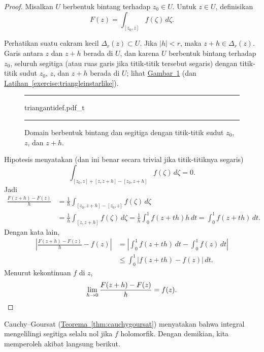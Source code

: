 \documentclass[12pt,openany]{book}
\newcommand{\sabs}[1]{\lvert {#1} \rvert}
\newcommand{\abs}[1]{\left\lvert {#1} \right\rvert}
\theoremstyle{plain}
\theoremstyle{remark}
\theoremstyle{definition}
\newenvironment{myfig}{%
\begin{figure}[h!t]
\noindent\rule{\textwidth}{0.5pt}\vspace{12pt}\par\centering}%
{\par\noindent\rule{\textwidth}{0.5pt}
\end{figure}}
\theoremstyle{exercise}
\theoremstyle{example}
\newcommand{\figureref}[1]{\hyperref[#1]{Gambar~\ref*{#1}}}
\newcommand{\exerciseref}[1]{\hyperref[#1]{Latihan~\ref*{#1}}}
\newcommand{\thmref}[1]{\hyperref[#1]{Teorema~\ref*{#1}}}
\begin{document}
\begin{proof}
Misalkan $U$ berbentuk bintang terhadap $z_0 \in U$.
Untuk $z \in U$, definisikan
\begin{equation*}
F(z) = \int_{[z_0,z]} f(\zeta) \, d\zeta .
\end{equation*}

Perhatikan suatu cakram kecil $\Delta_r(z) \subset U$.
Jika $\sabs{h} < r$, maka
$z+h \in \Delta_r(z)$.
Garis antara $z$ dan $z+h$ berada di $U$, dan
karena $U$ berbentuk bintang terhadap $z_0$, 
seluruh segitiga (atau ruas garis jika titik-titik tersebut segaris)
dengan titik-titik sudut $z_0$, $z$, dan $z+h$
berada di $U$; lihat \figureref{fig:triangantidef}
(dan \exerciseref{exercise:triangleinstarlike}).
\begin{myfig}
{triangantidef.pdf_t}
\caption{Domain berbentuk bintang dan segitiga dengan titik-titik sudut
$z_0$, $z$, dan $z+h$.\label{fig:triangantidef}}
\end{myfig}

Hipotesis menyatakan (dan ini benar secara trivial jika titik-titiknya segaris)
\begin{equation*}
\int_{[z_0,z]+[z,z+h]-[z_0,z+h]} f(\zeta) \, d\zeta = 0 .
\end{equation*}
Jadi
\begin{equation*}
\begin{split}
\frac{F(z+h)-F(z)}{h} &=
\frac{1}{h}
\int_{[z_0,z+h]-[z_0,z]} f(\zeta) \, d\zeta
\\
& =
\frac{1}{h}
\int_{[z,z+h]} f(\zeta) \, d\zeta
=
\frac{1}{h}
\int_0^1 f(z+th) h \, dt
=
\int_0^1 f(z+th) \, dt .
\end{split}
\end{equation*}
Dengan kata lain,
\begin{equation*}
\begin{split}
\abs{
\frac{F(z+h)-F(z)}{h} 
-
f(z)
}
& =
\abs{
\int_0^1 f(z+th) \, dt
-
\int_0^1 f(z) \, dt
}
\\
& \leq
\int_0^1 \abs{f(z+th)-f(z)} \, dt .
\end{split}
\end{equation*}
Menurut kekontinuan $f$ di $z$,
\begin{equation*}
\lim_{h \to 0}
\frac{F(z+h)-F(z)}{h} 
=
f(z) . \qedhere
\end{equation*}
\end{proof}

Cauchy--Goursat (\thmref{thm:cauchygoursat}) menyatakan bahwa integral mengelilingi
segitiga selalu nol jika $f$ holomorfik.  Dengan demikian, kita memperoleh
akibat langsung berikut.
\end{document}
